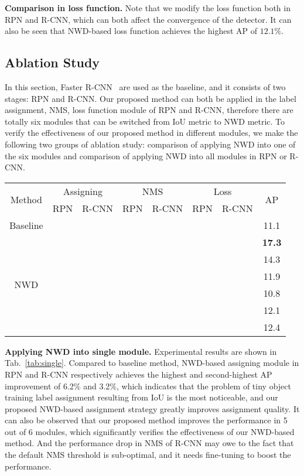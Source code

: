 \documentclass{article}
\begin{document}
\textbf{Comparison in loss function.} Note that we modify the loss function both in RPN and R-CNN, which can both affect the convergence of the detector. It can also be seen that NWD-based loss function achieves the highest AP of $12.1\%$. 


\subsection{Ablation Study}
 In this section, Faster R-CNN~\cite{Faster-R-CNN_2015_NIPS} are used as the baseline, and it consists of two stages: RPN and R-CNN. Our proposed method can both be applied in the label assignment, NMS, loss function module of RPN and R-CNN, therefore there are totally six modules that can be switched from IoU metric to NWD metric. To verify the effectiveness of our proposed method in different modules, we make the following two groups of ablation study: comparison of applying NWD into one of the six modules and comparison of applying NWD into all modules in RPN or R-CNN.

\begin{table*}[t]
	\centering
\setlength{\belowcaptionskip}{0.2cm}
	\caption{Ablation experiments when NWD is applied to single module.}
	\begin{tabular}{|c|cc|cc|cc|c|}  
	\hline
	\multirow{2}{*}{Method}  & \multicolumn{2}{c|}{Assigning}  & \multicolumn{2}{c|}{NMS}  & \multicolumn{2}{c|}{Loss} & \multirow{2}{*}{AP} \\
	&  RPN & R-CNN & RPN & R-CNN & RPN & R-CNN & \\
	\hline
	Baseline & & & & & & & 11.1 \\
	\hline
	\multirow{6}{*}{NWD}  & \checkmark &  &  &  &  &  & \textbf{17.3} \\
	                      &  & \checkmark &  &  &  &  & 14.3 \\
	                      &  &  & \checkmark &  &  &  & 11.9 \\
	                      &  &  &  & \checkmark &  &  & 10.8 \\
	                      &  &  &  &  & \checkmark  &  & 12.1 \\
	                      &  &  &  &  &  & \checkmark & 12.4 \\
	\hline
	\end{tabular}
	\label{tab:single}
\end{table*}

\textbf{Applying NWD into single module.} Experimental results are shown in Tab.~\ref{tab:single}. Compared to baseline method, NWD-based assigning module in RPN and R-CNN respectively achieves the highest and second-highest AP improvement of 6.2\% and 3.2\%, which indicates that the problem of tiny object training label assignment resulting from IoU is the most noticeable, and our proposed NWD-based assignment strategy greatly improves assignment quality. It can also be observed that our proposed method improves the performance in 5 out of 6 modules, which significantly verifies the effectiveness of our NWD-based method. And the performance drop in NMS of R-CNN may owe to the fact that the default NMS threshold is sub-optimal, and it needs fine-tuning to boost the performance. 
\end{document}
